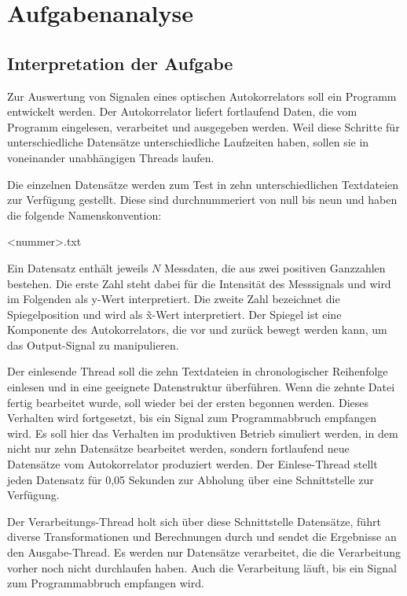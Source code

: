 \chapter{Aufgabenanalyse}\label{ch:aufgabenanalyse}


\section{Interpretation der Aufgabe}\label{sec:interpretation-der-aufgabe}
Zur Auswertung von Signalen eines optischen Autokorrelators soll ein Programm entwickelt werden.
Der Autokorrelator liefert fortlaufend Daten, die vom Programm eingelesen, verarbeitet und ausgegeben werden.
Weil diese Schritte für unterschiedliche Datensätze unterschiedliche Laufzeiten haben, sollen sie in voneinander unabhängigen Threads laufen.

Die einzelnen Datensätze werden zum Test in zehn unterschiedlichen Textdateien zur Verfügung gestellt.
Diese sind durchnummeriert von null bis neun und haben die folgende Namenskonvention:
\begin{center}
    <nummer>.txt
\end{center}
Ein Datensatz enthält jeweils $N$ Messdaten, die aus zwei positiven Ganzzahlen bestehen.
Die erste Zahl steht dabei für die Intensität des Messsignals und wird im Folgenden als y-Wert interpretiert.
Die zweite Zahl bezeichnet die Spiegelposition und wird als \~x-Wert interpretiert.
Der Spiegel ist eine Komponente des Autokorrelators, die vor und zurück bewegt werden kann, um das Output-Signal zu manipulieren.

Der einlesende Thread soll die zehn Textdateien in chronologischer Reihenfolge einlesen und in eine geeignete Datenstruktur überführen.
Wenn die zehnte Datei fertig bearbeitet wurde, soll wieder bei der ersten begonnen werden.
Dieses Verhalten wird fortgesetzt, bis ein Signal zum Programmabbruch empfangen wird.
Es soll hier das Verhalten im produktiven Betrieb simuliert werden, in dem nicht nur zehn Datensätze bearbeitet werden, sondern fortlaufend neue Datensätze vom Autokorrelator produziert werden.
Der Einlese-Thread stellt jeden Datensatz für 0,05 Sekunden zur Abholung über eine Schnittstelle zur Verfügung.

Der Verarbeitungs-Thread holt sich über diese Schnittstelle Datensätze, führt diverse Transformationen und Berechnungen durch und sendet die Ergebnisse an den Ausgabe-Thread.
Es werden nur Datensätze verarbeitet, die die Verarbeitung vorher noch nicht durchlaufen haben.
Auch die Verarbeitung läuft, bis ein Signal zum Programmabbruch empfangen wird.

